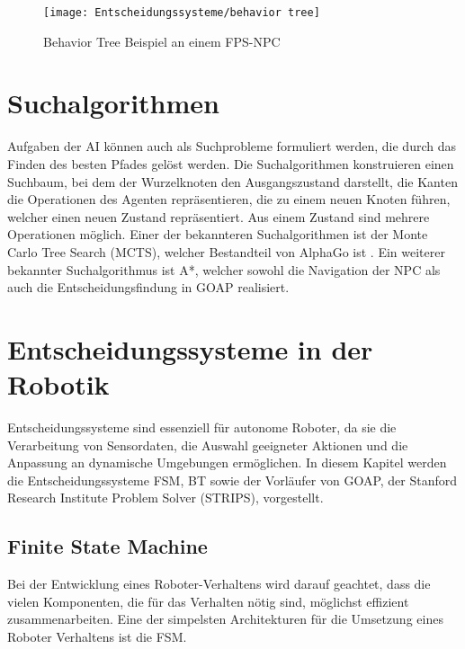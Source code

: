 \begin{figure}[h]
  \centering
  \texttt{[image: Entscheidungssysteme/behavior tree]}
	\captionsetup{justification=justified, format=plain}
  \caption{Behavior Tree Beispiel an einem FPS-NPC}
  \label{BT}
\end{figure}


\section{Suchalgorithmen}
\label{chap:monte-carlo}

Aufgaben der AI k\"{o}nnen auch als Suchprobleme formuliert werden, die durch das Finden des besten Pfades gel\"{o}st werden. Die Suchalgorithmen konstruieren einen Suchbaum, bei dem der Wurzelknoten den Ausgangszustand darstellt, die Kanten die Operationen des Agenten repr\"{a}sentieren, die zu einem neuen Knoten f\"{u}hren, welcher einen neuen Zustand repr\"{a}sentiert. Aus einem Zustand sind mehrere Operationen m\"{o}glich. Einer der bekannteren Suchalgorithmen ist der Monte Carlo Tree Search (MCTS), welcher Bestandteil von AlphaGo ist \autocite{review_game_ai}. Ein weiterer bekannter Suchalgorithmus ist A*, welcher sowohl die Navigation der NPC als auch die Entscheidungsfindung in GOAP realisiert.

\section{Entscheidungssysteme in der Robotik}
\label{chap:robotik}

Entscheidungssysteme sind essenziell f\"{u}r autonome Roboter, da sie die Verarbeitung von Sensordaten, die Auswahl geeigneter Aktionen und die Anpassung an dynamische Umgebungen erm\"{o}glichen. In diesem Kapitel werden die Entscheidungssysteme FSM, BT sowie der Vorl\"{a}ufer von GOAP, der Stanford Research Institute Problem Solver (STRIPS), vorgestellt.

\subsection{Finite State Machine}
\label{chap:fsm robotik}

Bei der Entwicklung eines Roboter-Verhaltens wird darauf geachtet, dass die vielen Komponenten, die f\"{u}r das Verhalten n\"{o}tig sind, m\"{o}glichst effizient zusammenarbeiten. Eine der simpelsten Architekturen f\"{u}r die Umsetzung eines Roboter Verhaltens ist die FSM.

